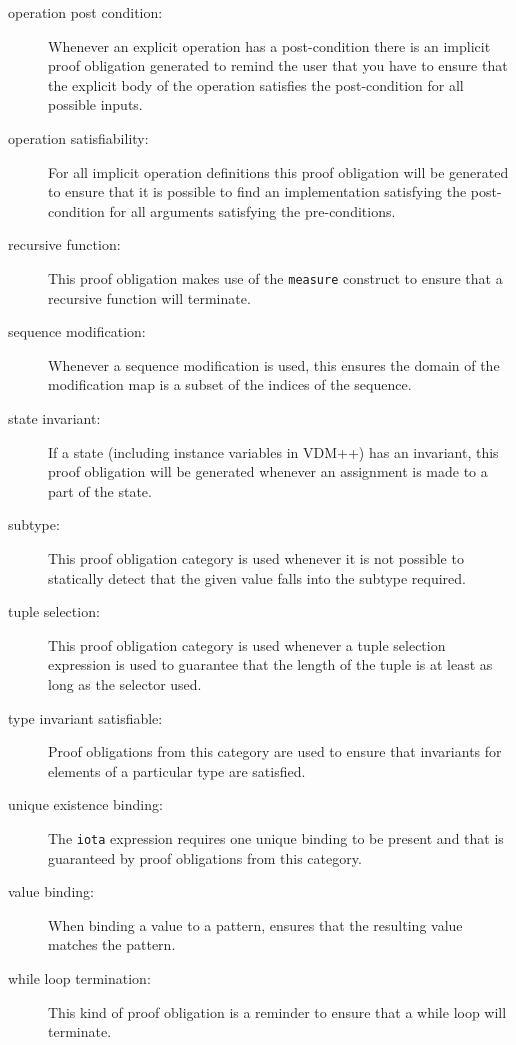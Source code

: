 \begin{description}
\item[operation post condition:] Whenever an explicit operation has a
  post-condition there is an implicit proof obligation generated to
  remind the user that you have to ensure that the explicit body
  of the operation satisfies the post-condition for all possible inputs.

\item[operation satisfiability:] For all implicit operation definitions
  this proof obligation will be generated to ensure that it is
  possible to find an implementation satisfying the post-condition for all
  arguments satisfying the pre-conditions.

\item[recursive function:] This proof obligation makes use of the
  \texttt{measure} construct to ensure that a recursive function
  will terminate.

\item[sequence modification:] Whenever a sequence modification is used, this
    ensures the domain of the modification map is a subset of the indices of the 
    sequence.

\item[state invariant:] If a state (including instance variables in
  VDM++) has an invariant, this proof obligation will be generated
  whenever an assignment is made to a part of the state.

\item[subtype:] This proof obligation category is used whenever it is
  not possible to statically detect that the given value
  falls into the subtype required.

\item[tuple selection:] This proof obligation category is used
  whenever a tuple selection expression is used to
  guarantee that the length of the tuple is at least as long as the
  selector used.

\item[type invariant satisfiable:] Proof obligations from this category are used
  to ensure that invariants for elements of a particular type are satisfied.

\item[unique existence binding:] The \texttt{iota} expression
  requires one unique binding to be present and that is guaranteed by
  proof obligations from this category.

\item[value binding:] When binding a value to a pattern, ensures that the
    resulting value matches the pattern.

\item[while loop termination:] This kind of proof obligation is a
  reminder to ensure that a while loop will terminate.

\end{description}

